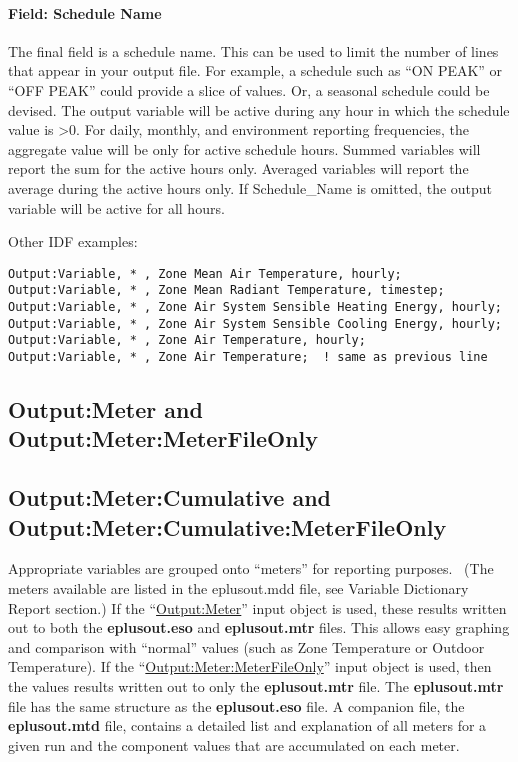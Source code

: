 \paragraph{Field: Schedule Name}\label{field-schedule-name-004}

The final field is a schedule name. This can be used to limit the number of lines that appear in your output file. For example, a schedule such as ``ON PEAK'' or ``OFF PEAK'' could provide a slice of values. Or, a seasonal schedule could be devised. The output variable will be active during any hour in which the schedule value is \textgreater{}0. For daily, monthly, and environment reporting frequencies, the aggregate value will be only for active schedule hours. Summed variables will report the sum for the active hours only. Averaged variables will report the average during the active hours only. If Schedule\_Name is omitted, the output variable will be active for all hours.

Other IDF examples:

\begin{lstlisting}
Output:Variable, * , Zone Mean Air Temperature, hourly;
Output:Variable, * , Zone Mean Radiant Temperature, timestep;
Output:Variable, * , Zone Air System Sensible Heating Energy, hourly;
Output:Variable, * , Zone Air System Sensible Cooling Energy, hourly;
Output:Variable, * , Zone Air Temperature, hourly;
Output:Variable, * , Zone Air Temperature;  ! same as previous line
\end{lstlisting}

\subsection{Output:\-Meter and Output:\-Meter:\-Meter\-File\-Only}\label{outputmeter-and-outputmetermeterfileonly}

\subsection{Output:\-Meter:\-Cumulative and Output:\-Meter:\-Cumulative:\-Meter\-File\-Only}\label{outputmetercumulative-and-outputmetercumulativemeterfileonly}

Appropriate variables are grouped onto ``meters'' for reporting purposes.~ (The meters available are listed in the eplusout.mdd file, see Variable Dictionary Report section.) If the ``\hyperref[outputmeter-and-outputmetermeterfileonly]{Output:Meter}'' input object is used, these results written out to both the \textbf{eplusout.eso} and \textbf{eplusout.mtr} files. This allows easy graphing and comparison with ``normal'' values (such as Zone Temperature or Outdoor Temperature). If the ``\hyperref[outputmeter-and-outputmetermeterfileonly]{Output:Meter:MeterFileOnly}'' input object is used, then the values results written out to only the \textbf{eplusout.mtr} file. The \textbf{eplusout.mtr} file has the same structure as the \textbf{eplusout.eso} file. A companion file, the \textbf{eplusout.mtd} file, contains a detailed list and explanation of all meters for a given run and the component values that are accumulated on each meter.


